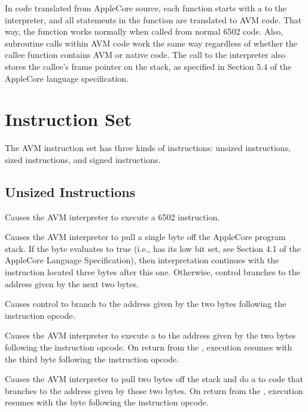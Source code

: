 \documentclass[10pt]{article}
\begin{document}
In code translated from AppleCore source, each function starts with a
 to the interpreter, and all statements in the function are
translated to AVM code.  That way, the function works normally when
called from normal 6502 code.  Also, subroutine calls within AVM
code work the same way regardless of whether the callee function
contains AVM or native code.
The call to the interpreter also stores the callee's frame pointer
on the stack, as specified in Section 5.4 of the AppleCore
language specification.

\section{Instruction Set}

The AVM instruction set has three kinds of instructions: unsized instructions, sized
instructions, and signed instructions.

\subsection{Unsized Instructions}

%
Causes the AVM interpreter to execute a 6502  instruction.

%
Causes the AVM interpreter to pull a single byte off the AppleCore
program stack.  If the byte evaluates to true (i.e., has its low
bit set, see Section 4.1 of the AppleCore Language Specification),
then interpretation continues with the instruction located three
bytes after this one.  Otherwise, control branches to the address
given by the next two bytes.

%
Causes control to branch to the address given by the two bytes
following the instruction opcode.

%
Causes the AVM interpreter to execute a  to the address
given by the two bytes following the instruction opcode.  On
return from the , execution resumes with the third byte
following the instruction opcode.

%
Causes the AVM interpreter to pull two bytes off the stack
and do a  to code that branches to the address given
by those two bytes.  On return from the , execution
resumes with the byte following the instruction opcode.
\end{document}
